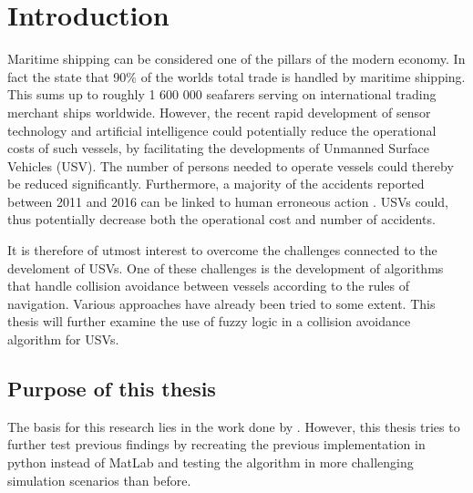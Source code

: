 

\chapter{Introduction} %

\label{Introduction} %


\newcommand{\keyword}[1]{\textbf{#1}}
\newcommand{\tabhead}[1]{\textbf{#1}}
\newcommand{\code}[1]{\texttt{#1}}
\newcommand{\file}[1]{\texttt{\bfseries#1}}
\newcommand{\option}[1]{\texttt{\itshape#1}}


Maritime shipping can be considered one of the pillars of the modern economy. In fact the \textcite{percent_trade} state that 90\% of the worlds total trade is handled by maritime shipping. This sums up to roughly 1 600 000 seafarers serving on international trading merchant ships worldwide. However, the recent rapid development of sensor technology and artificial intelligence could potentially reduce the operational costs of such vessels, by facilitating the developments of  Unmanned Surface Vehicles (USV). The number of persons needed to operate vessels could thereby be reduced significantly. Furthermore, a majority of the accidents reported between 2011 and 2016 can be linked to human erroneous action \cite{marine_casualities_incidents_2017}. USVs could, thus potentially decrease both the operational cost and number of accidents.

It is therefore of utmost interest to overcome the challenges connected to the develoment of USVs. One of these challenges is the development of algorithms that handle collision avoidance between vessels according to the rules of navigation. Various approaches have already been tried to some extent. This thesis will further examine the use of  fuzzy logic in a collision avoidance algorithm for USVs.
\section{Purpose of this thesis}
The basis for this research lies in the work done by \textcite{perera2012intelligent}. However, this thesis tries to further test previous findings by recreating the previous implementation in python instead of MatLab and testing the algorithm in more challenging simulation scenarios than before.

